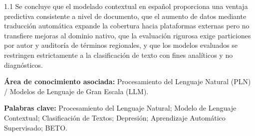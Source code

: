 \documentclass[12pt,a4paper]{article}
\begin{document}
\begin{spacing}{1.1}
Se concluye que el modelado contextual en español proporciona una ventaja predictiva consistente a nivel de documento, que el aumento de datos mediante traducción automática expande la cobertura hacia plataformas externas pero no transfiere mejoras al dominio nativo, que la evaluación rigurosa exige particiones por autor y auditoría de términos regionales, y que los modelos evaluados se restringen estrictamente a la clasificación de texto con fines analíticos y no diagnósticos.

\vspace{0.3cm}
\noindent\textbf{Área de conocimiento asociada:} Procesamiento del Lenguaje Natural (PLN) / Modelos de Lenguaje de Gran Escala (LLM).

\noindent\textbf{Palabras clave:} Procesamiento del Lenguaje Natural; Modelo de Lenguaje Contextual; Clasificación de Textos; Depresión; Aprendizaje Automático Supervisado; BETO.
\end{spacing}

\newpage
\end{document}
